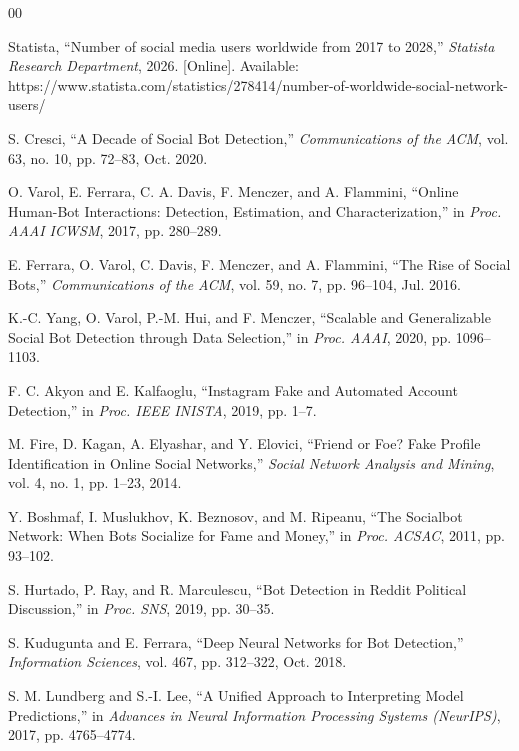 \documentclass[conference]{IEEEtran}
\begin{document}
\begin{thebibliography}{00}

Statista, ``Number of social media users worldwide from 2017 to 2028,'' \textit{Statista Research Department}, 2026. [Online]. Available: https://www.statista.com/statistics/278414/number-of-worldwide-social-network-users/

S. Cresci, ``A Decade of Social Bot Detection,'' \textit{Communications of the ACM}, vol. 63, no. 10, pp. 72--83, Oct. 2020.

O. Varol, E. Ferrara, C. A. Davis, F. Menczer, and A. Flammini, ``Online Human-Bot Interactions: Detection, Estimation, and Characterization,'' in \textit{Proc. AAAI ICWSM}, 2017, pp. 280--289.

E. Ferrara, O. Varol, C. Davis, F. Menczer, and A. Flammini, ``The Rise of Social Bots,'' \textit{Communications of the ACM}, vol. 59, no. 7, pp. 96--104, Jul. 2016.

K.-C. Yang, O. Varol, P.-M. Hui, and F. Menczer, ``Scalable and Generalizable Social Bot Detection through Data Selection,'' in \textit{Proc. AAAI}, 2020, pp. 1096--1103.

F. C. Akyon and E. Kalfaoglu, ``Instagram Fake and Automated Account Detection,'' in \textit{Proc. IEEE INISTA}, 2019, pp. 1--7.

M. Fire, D. Kagan, A. Elyashar, and Y. Elovici, ``Friend or Foe? Fake Profile Identification in Online Social Networks,'' \textit{Social Network Analysis and Mining}, vol. 4, no. 1, pp. 1--23, 2014.

Y. Boshmaf, I. Muslukhov, K. Beznosov, and M. Ripeanu, ``The Socialbot Network: When Bots Socialize for Fame and Money,'' in \textit{Proc. ACSAC}, 2011, pp. 93--102.

S. Hurtado, P. Ray, and R. Marculescu, ``Bot Detection in Reddit Political Discussion,'' in \textit{Proc. SNS}, 2019, pp. 30--35.

S. Kudugunta and E. Ferrara, ``Deep Neural Networks for Bot Detection,'' \textit{Information Sciences}, vol. 467, pp. 312--322, Oct. 2018.

S. M. Lundberg and S.-I. Lee, ``A Unified Approach to Interpreting Model Predictions,'' in \textit{Advances in Neural Information Processing Systems (NeurIPS)}, 2017, pp. 4765--4774.


\end{thebibliography}
\end{document}
